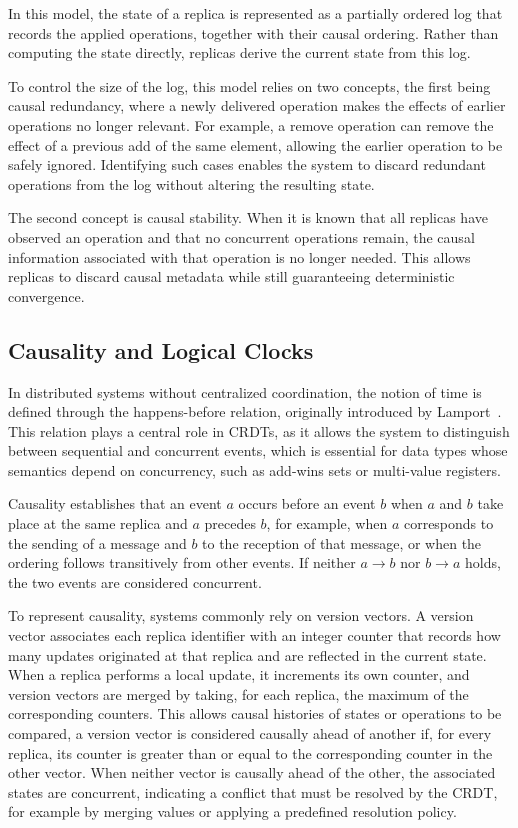 In this model, the state of a replica is represented as a partially ordered log that records the applied operations, together with their causal ordering. Rather than computing the state directly, replicas derive the current state from this log.

To control the size of the log, this model relies on two concepts, the first being causal redundancy, where a newly delivered operation makes the effects of earlier operations no longer relevant. For example, a remove operation can remove the effect of a previous add of the same element, allowing the earlier operation to be safely ignored. Identifying such cases enables the system to discard redundant operations from the log without altering the resulting state.

The second concept is causal stability. When it is known that all replicas have observed an operation and that no concurrent operations remain, the causal information associated with that operation is no longer needed. This allows replicas to discard causal metadata while still guaranteeing deterministic convergence.

\subsection{Causality and Logical Clocks}
\label{sub:logical_clocks}

In distributed systems without centralized coordination, the notion of time is defined through the happens-before relation, originally introduced by Lamport~\cite{lamport2019clocks}. This relation plays a central role in CRDTs, as it allows the system to distinguish between sequential and concurrent events, which is essential for data types whose semantics depend on concurrency, such as add-wins sets or multi-value registers.

Causality establishes that an event $a$ occurs before an event $b$ when $a$ and $b$ take place at the same replica and $a$ precedes $b$, for example, when $a$ corresponds to the sending of a message and $b$ to the reception of that message, or when the ordering follows transitively from other events. If neither $a \rightarrow b$ nor $b \rightarrow a$ holds, the two events are considered concurrent.

To represent causality, systems commonly rely on version vectors. A version vector associates each replica identifier with an integer counter that records how many updates originated at that replica and are reflected in the current state. When a replica performs a local update, it increments its own counter, and version vectors are merged by taking, for each replica, the maximum of the corresponding counters. This allows causal histories of states or operations to be compared, a version vector is considered causally ahead of another if, for every replica, its counter is greater than or equal to the corresponding counter in the other vector. When neither vector is causally ahead of the other, the associated states are concurrent, indicating a conflict that must be resolved by the CRDT, for example by merging values or applying a predefined resolution policy.

